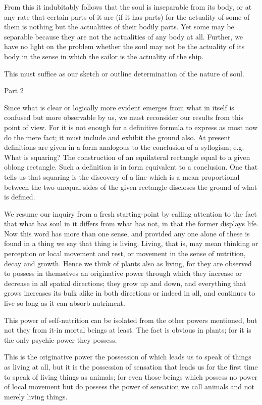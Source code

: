 From this it indubitably follows that the soul is inseparable from
its body, or at any rate that certain parts of it are (if it has parts)
for the actuality of some of them is nothing but the actualities of
their bodily parts. Yet some may be separable because they are not
the actualities of any body at all. Further, we have no light on the
problem whether the soul may not be the actuality of its body in the
sense in which the sailor is the actuality of the ship. 

This must suffice as our sketch or outline determination of the nature
of soul. 

Part 2

Since what is clear or logically more evident emerges from what in
itself is confused but more observable by us, we must reconsider our
results from this point of view. For it is not enough for a definitive
formula to express as most now do the mere fact; it must include and
exhibit the ground also. At present definitions are given in a form
analogous to the conclusion of a syllogism; e.g. What is squaring?
The construction of an equilateral rectangle equal to a given oblong
rectangle. Such a definition is in form equivalent to a conclusion.
One that tells us that squaring is the discovery of a line which is
a mean proportional between the two unequal sides of the given rectangle
discloses the ground of what is defined. 

We resume our inquiry from a fresh starting-point by calling attention
to the fact that what has soul in it differs from what has not, in
that the former displays life. Now this word has more than one sense,
and provided any one alone of these is found in a thing we say that
thing is living. Living, that is, may mean thinking or perception
or local movement and rest, or movement in the sense of nutrition,
decay and growth. Hence we think of plants also as living, for they
are observed to possess in themselves an originative power through
which they increase or decrease in all spatial directions; they grow
up and down, and everything that grows increases its bulk alike in
both directions or indeed in all, and continues to live so long as
it can absorb nutriment. 

This power of self-nutrition can be isolated from the other powers
mentioned, but not they from it-in mortal beings at least. The fact
is obvious in plants; for it is the only psychic power they possess.

This is the originative power the possession of which leads us to
speak of things as living at all, but it is the possession of sensation
that leads us for the first time to speak of living things as animals;
for even those beings which possess no power of local movement but
do possess the power of sensation we call animals and not merely living
things. 

